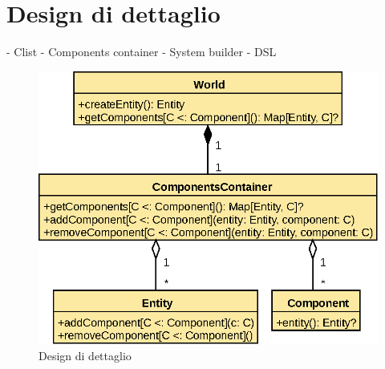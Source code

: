 \chapter{Design di dettaglio}\label{ch:design-di-dettaglio}
- Clist
- Components container
- System builder
- DSL

\begin{figure}
    \includegraphics{./img/WorldDetail}
    \caption{Design di dettaglio}
    \label{fig:figure2}
\end{figure}
